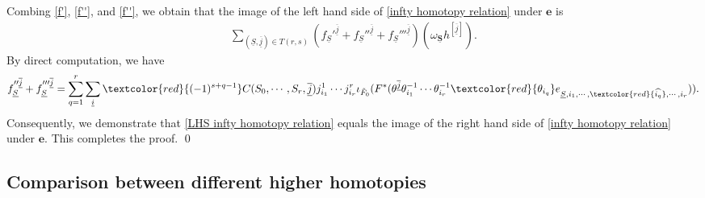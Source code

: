 \documentclass[12pt, a4paper]{article}
\begin{document}
Combing \eqref{f'}, \eqref{f''}, and \eqref{f''}, we obtain that the image of the left hand side of \eqref{infty homotopy relation} under $\boldsymbol{e}$ is 
\begin{eqnarray}\label{LHS infty homotopy relation}
\sum_{(\underline S,\underline{\overline j})\in T(r,s)}(f_{\underline S}'^{\underline{\overline j}}+f_{\underline S}''^{\underline{\overline j}}+f_{\underline S}'''^{\underline{\overline j}})(\omega_{\boldsymbol{\underline S}}h^{[\underline{\overline j}]}).
\end{eqnarray}
By direct computation, we have
$$
f_{\underline S}''^{\underline{\overline j}}+f_{\underline S}'''^{\underline{\overline j}}=\sum_{q=1}^r\sum_{\underline i}\textcolor{red}{(-1)^{s+q-1}} C(S_0,\cdots,S_r,\underline{\overline j}) j_{i_1}^1\cdots j^r_{i_r}\iota_{\tilde F_0}(F^*(\theta^{\underline{\overline j}}\theta_{i_1}^{-1}\cdots\theta_{i_r}^{-1}\textcolor{red}{\theta_{i_q}}e_{\underline S,i_1,\cdots,\textcolor{red}{\widehat{i_q}},\cdots,i_r})).
$$
Consequently, we demonstrate that \eqref{LHS infty homotopy relation} equals the image of the right hand side of \eqref{infty homotopy relation} under $\boldsymbol{e}$. This completes the proof. \hfill\qed


\subsection{Comparison between different higher homotopies}
\end{document}
